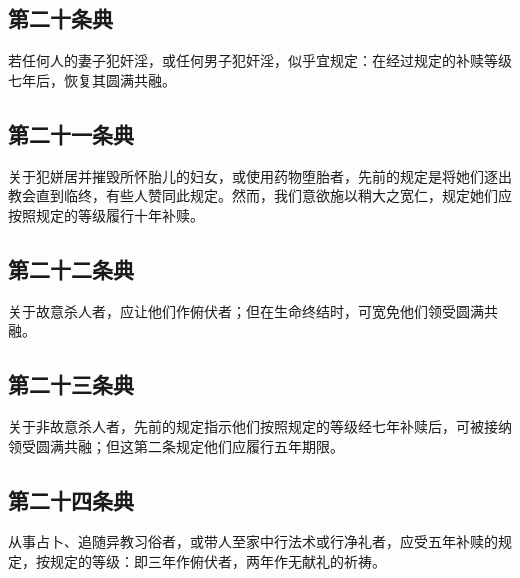 \subsection{第二十条典}

若任何人的妻子犯奸淫，或任何男子犯奸淫，似乎宜规定：在经过规定的补赎等级七年后，恢复其圆满共融。\par


\subsection{第二十一条典}

关于犯姘居并摧毁所怀胎儿的妇女，或使用药物堕胎者，先前的规定是将她们逐出教会直到临终，有些人赞同此规定。然而，我们意欲施以稍大之宽仁，规定她们应按照规定的等级履行十年补赎。\par


\subsection{第二十二条典}

关于故意杀人者，应让他们作俯伏者；但在生命终结时，可宽免他们领受圆满共融。\par


\subsection{第二十三条典}

关于非故意杀人者，先前的规定指示他们按照规定的等级经七年补赎后，可被接纳领受圆满共融；但这第二条规定他们应履行五年期限。\par


\subsection{第二十四条典}

从事占卜、追随异教习俗者，或带人至家中行法术或行净礼者，应受五年补赎的规定，按规定的等级：即三年作俯伏者，两年作无献礼的祈祷。\par

